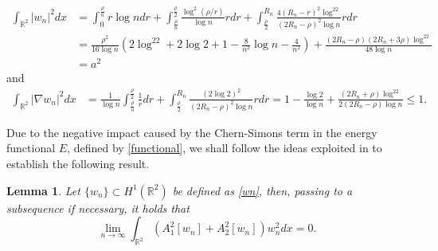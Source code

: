 \documentclass[11pt]{amsart}
\numberwithin{equation}{section}
\newtheorem{lemma}[theorem]{Lemma}
\theoremstyle{definition}
\newcommand{\R}{\mathbb{R}}
\begin{document}
\begin{align*}
 \int_{\R^2}|w_n|^2dx&=\int_0^{\frac\rho n}  r\log n dr+\int_{\frac \rho n}^{\frac \rho 2} \frac{\log^2(\rho/r)}{\log n} rdr
+\int_{\frac\rho2}^{R_n}  \frac{4(R_n-r)^2\log^22}{(2R_n-\rho)^2\log n}rdr    \\
 &=\frac{\rho^2}{16\log n} \left( 2\log^22+2\log2+1-\frac8{n^2}\log n-\frac4{n^2}\right)
 +\frac{(2R_n-\rho)(2R_n+3\rho)\log^22}{48\log n}\\
&=a^2
\end{align*}
and
\begin{align*}
\displaystyle   \int_{\R^2}|\nabla w_n|^2dx &=\frac1{\log n}\int_{\frac\rho n}^{\frac\rho 2}\frac1rdr+\int_{\frac\rho2}^{R_n}
\frac{(2\log 2)^2}{(2R_n-\rho)^2\log n}rdr
   = 1-\frac{\log2}{\log n } + \frac{(2R_n+\rho)\log^22}{2(2R_n-\rho)\log n}\leq 1.
\end{align*}

Due to the negative impact caused by the Chern-Simons term in the energy functional $E$,
defined by \eqref{functional}, we shall follow the ideas exploited in \cite[Lemma 3.10]{SSY} to establish the following result.

\begin{lemma}\label{estimateChern-Simons}
Let $\{w_n\}\subset H^1(\R^2)$ be defined as \eqref{wn}, then, passing to a subsequence if necessary,
it holds that
\[
\lim_{n\to\infty}\int_{\R^2} (A_1^2[w_n]+A_2^2[w_n])w_n^2 dx=0.
\]
\end{lemma}
\end{document}
